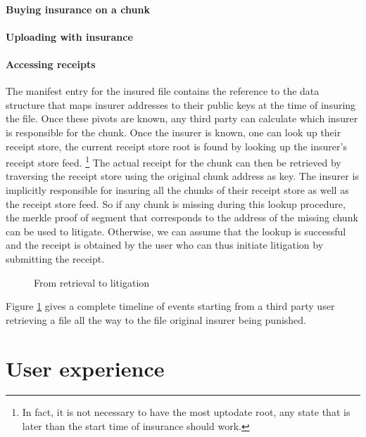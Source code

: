 \subsubsection{Buying insurance on a chunk}

\subsubsection{Uploading with insurance}


\subsubsection{Accessing receipts}

The manifest entry for the insured file contains the reference to the data structure that maps insurer addresses to their public keys at the time of insuring the file. Once these pivots are known, any third party can calculate which insurer is responsible for the chunk. Once the insurer is known, one can look up their receipt store, the current receipt store root is found by looking up the insurer's receipt store feed.%
%
\footnote{In fact, it is not necessary to have the most uptodate root, any state that is later than the start time of insurance should work.}
%
The actual receipt for the chunk can then be retrieved by traversing the receipt store using the original chunk address as key.  The insurer is implicitly responsible for insuring all the chunks of their receipt store as well as the receipt store feed. So if any chunk is missing during this lookup procedure, the merkle proof of segment that corresponds to the address of the missing chunk can be used to litigate. 
Otherwise, we can assume that the lookup is successful and the receipt is obtained by the user who can thus initiate litigation by submitting the receipt. 


\begin{figure}[htbp]
  \centering
  \caption[From retrieval to litigation]{From retrieval to litigation}
  \label{fig:flowchart-retrieval-litigation}
\end{figure}


Figure \ref{fig:flowchart-retrieval-litigation} gives a complete timeline of events starting from a third party user retrieving  a file all the way to the file original insurer being punished.





\chapter{User experience}\label{sec:ux}

